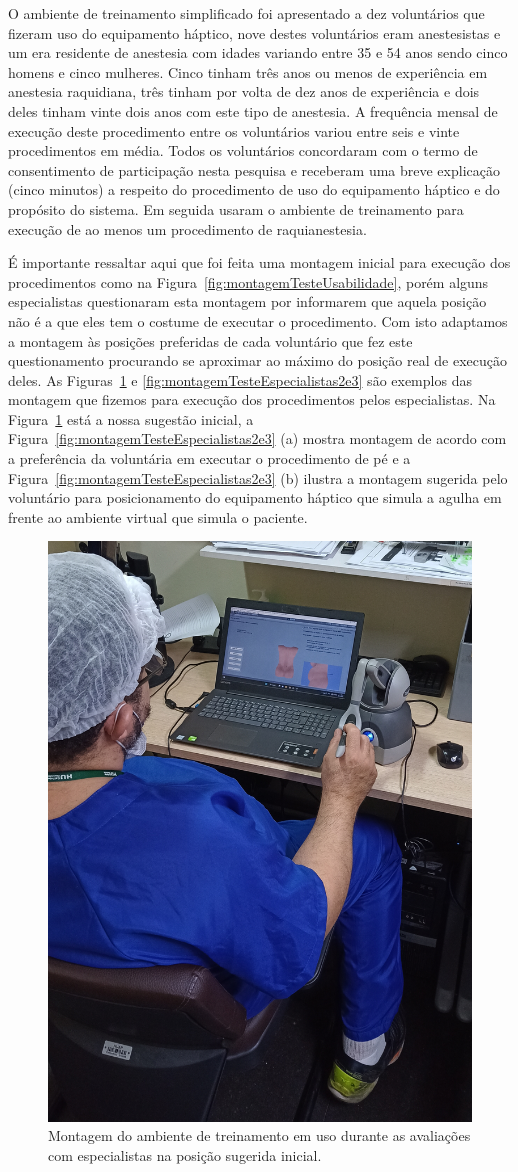 O ambiente de treinamento simplificado foi apresentado a dez voluntários que fizeram uso do equipamento háptico, nove destes voluntários eram anestesistas e um era residente de anestesia com idades variando entre 35 e 54 anos sendo cinco homens e cinco mulheres. Cinco tinham três anos ou menos de experiência em anestesia raquidiana, três tinham por volta de dez anos de experiência e dois deles tinham vinte dois anos com este tipo de anestesia. A frequência mensal de execução deste procedimento entre os voluntários variou entre seis e vinte procedimentos em média. Todos os voluntários concordaram com o termo de consentimento de participação nesta pesquisa e receberam uma breve explicação (cinco minutos) a respeito do procedimento de uso do equipamento háptico e do propósito do sistema. Em seguida usaram o ambiente de treinamento para execução de ao menos um procedimento de raquianestesia. 

É importante ressaltar aqui que foi feita uma montagem inicial para execução dos procedimentos como na Figura~\ref{fig:montagemTesteUsabilidade}, porém alguns especialistas questionaram esta montagem por informarem que aquela posição não é a que eles tem o costume de executar o procedimento. Com isto adaptamos a montagem às posições preferidas de cada voluntário que fez este questionamento procurando se aproximar ao máximo do posição real de execução deles. As Figuras~\ref{fig:montagemTesteEspecialistasInicial} e \ref{fig:montagemTesteEspecialistas2e3} são exemplos das montagem que fizemos para execução dos procedimentos pelos especialistas. Na Figura~\ref{fig:montagemTesteEspecialistasInicial} está a nossa sugestão inicial, a Figura~\ref{fig:montagemTesteEspecialistas2e3} (a) mostra montagem de acordo com a preferência da voluntária em executar o procedimento de pé e a Figura~\ref{fig:montagemTesteEspecialistas2e3} (b) ilustra a montagem sugerida pelo voluntário para posicionamento do equipamento háptico que simula a agulha em frente ao ambiente virtual que simula o paciente.

\begin{figure}[ht!]
    \centering
    \includegraphics[width=0.4\linewidth]{capitulos/figuras/montagem-teste-especialistas-1.jpg} 
    \caption{Montagem do ambiente de treinamento em uso durante as avaliações com especialistas na posição sugerida inicial.}
    \label{fig:montagemTesteEspecialistasInicial}
\end{figure}



